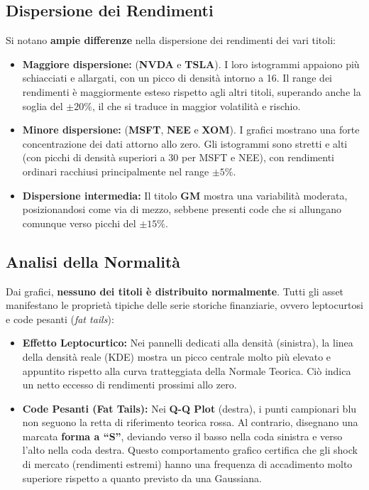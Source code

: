 \documentclass[11pt, a4paper]{report} %
\begin{document}
\subsection{Dispersione dei Rendimenti}
Si notano \textbf{ampie differenze} nella dispersione dei rendimenti dei vari titoli:
\begin{itemize}
    \item \textbf{Maggiore dispersione:} (\textbf{NVDA} e \textbf{TSLA}). I loro istogrammi appaiono più schiacciati e allargati, con un picco di densità intorno a 16. Il range dei rendimenti è maggiormente esteso rispetto agli altri titoli, superando anche la soglia del $\pm 20\%$, il che si traduce in maggior volatilità e rischio.
    \item \textbf{Minore dispersione:} (\textbf{MSFT}, \textbf{NEE} e \textbf{XOM}). I grafici mostrano una forte concentrazione dei dati attorno allo zero. Gli istogrammi sono stretti e alti (con picchi di densità superiori a 30 per MSFT e NEE), con rendimenti ordinari racchiusi principalmente nel range $\pm 5\%$.
    \item \textbf{Dispersione intermedia:} Il titolo \textbf{GM} mostra una variabilità moderata, posizionandosi come via di mezzo, sebbene presenti code che si allungano comunque verso picchi del $\pm 15\%$.
\end{itemize}

\subsection{Analisi della Normalità}
Dai grafici, \textbf{nessuno dei titoli è distribuito normalmente}. Tutti gli asset manifestano le proprietà tipiche delle serie storiche finanziarie, ovvero leptocurtosi e code pesanti (\textit{fat tails}):
\begin{itemize}
    \item \textbf{Effetto Leptocurtico:} Nei pannelli dedicati alla densità (sinistra), la linea della densità reale (KDE) mostra un picco centrale molto più elevato e appuntito rispetto alla curva tratteggiata della Normale Teorica. Ciò indica un netto eccesso di rendimenti prossimi allo zero.
    \item \textbf{Code Pesanti (Fat Tails):} Nei \textbf{Q-Q Plot} (destra), i punti campionari blu non seguono la retta di riferimento teorica rossa. Al contrario, disegnano una marcata \textbf{forma a ``S''}, deviando verso il basso nella coda sinistra e verso l'alto nella coda destra. Questo comportamento grafico certifica che gli shock di mercato (rendimenti estremi) hanno una frequenza di accadimento molto superiore rispetto a quanto previsto da una Gaussiana.
\end{itemize}
\end{document}
